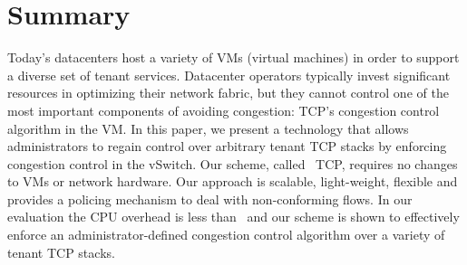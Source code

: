 \section{Summary}
Today's datacenters host a variety of VMs (virtual machines) in order to
support a diverse set of tenant services. Datacenter operators
typically invest significant resources in optimizing their network fabric,
but they cannot control one of the most important components of 
avoiding congestion: TCP's congestion control algorithm in the VM. In this paper,
we present a technology that allows administrators to regain control over arbitrary tenant TCP stacks by enforcing congestion
control in the vSwitch. Our scheme, called~\acdc{} TCP, requires no 
changes to VMs or network hardware. Our approach is scalable, light-weight,
flexible and provides a policing mechanism to deal with non-conforming flows.
In our evaluation the CPU overhead is less than~ and our scheme 
is shown to effectively enforce an administrator-defined congestion control
algorithm over a variety of tenant TCP stacks.

